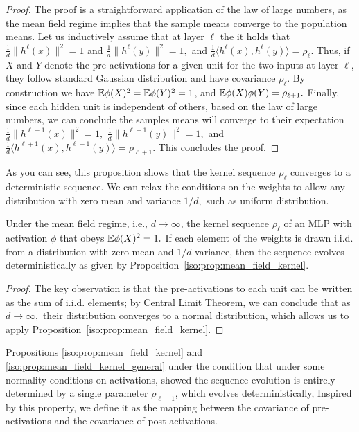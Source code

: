 \begin{proof}
 The proof is a straightforward application of the law of large numbers, as the mean field regime implies that the sample means converge to the population means. Let us inductively assume that at layer $\ell$ the it holds that $\frac1d\|h^{\ell}(x)\|^2 = 1$ and $\frac1d\|h^{\ell}(y)\|^2=1,$ and $\frac1d\langle h^{\ell}(x),h^{\ell}(y)\rangle = \rho_{\ell}$. Thus, if $X$ and $Y$ denote the pre-activations for a given unit for the two inputs at layer $\ell$, they follow standard Gaussian distribution and have covariance $\rho_{\ell}.$ By construction we have $\mathbb{E} \phi(X)^2 = \mathbb{E} \phi(Y)^2 = 1$, and $\mathbb{E} \phi(X)\phi(Y) = \rho_{\ell+1}.$ Finally, since each hidden unit is independent of others, based on the law of large numbers, we can conclude the samples means will converge to their expectation $\frac1d \|h^{\ell+1}(x)\|^2 = 1, $ $\frac1d \|h^{\ell+1}(y)\|^2 = 1,$ and $\frac1d \langle h^{\ell+1}(x),h^{\ell+1}(y)\rangle = \rho_{\ell+1}. $ This concludes the proof. 
\end{proof}

As you can see, this proposition shows that the kernel sequence $\rho_\ell$ converges to a deterministic sequence. We can relax the conditions on the weights to allow any distribution with zero mean and variance $1/d,$ such as uniform distribution. 

\begin{proposition}
\label{iso:prop:mean_field_kernel_general}
Under the mean field regime, i.e., $d \to \infty$, the kernel sequence $\rho_\ell$ of an MLP with activation $\phi$ that obeys $\mathbb{E} \phi(X)^2=1.$ If each element of the weights is drawn i.i.d. from a distribution with zero mean and $1/d$ variance, then the sequence evolves deterministically as given by Proposition~\ref{iso:prop:mean_field_kernel}.
\end{proposition}

\begin{proof}
 The key observation is that the pre-activations to each unit can be written as the sum of i.i.d. elements; by Central Limit Theorem, we can conclude that as $d\to\infty,$ their distribution converges to a normal distribution, which allows us to apply Proposition~\ref{iso:prop:mean_field_kernel}.
\end{proof}




Propositions \ref{iso:prop:mean_field_kernel} and \ref{iso:prop:mean_field_kernel_general} under the condition that under some normality conditions on activations,  showed the sequence evolution is entirely determined by a single parameter $\rho_{\ell-1}$, which evolves deterministically, 
Inspired by this property, we define it as the mapping between the covariance of pre-activations and the covariance of post-activations.

